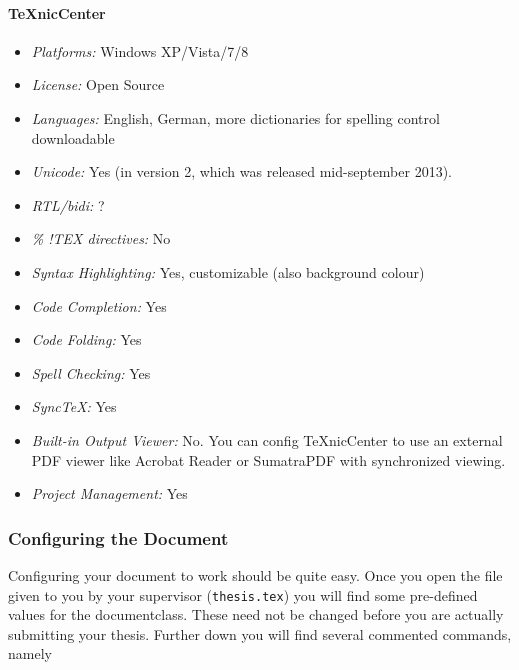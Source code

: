 \paragraph{TeXnicCenter}

\begin{itemize}
    \item \textit{Platforms:} Windows XP/Vista/7/8
    \item \textit{License:} Open Source
    \item \textit{Languages:} English, German, more dictionaries for spelling control downloadable
    \item \textit{Unicode:} Yes (in version 2, which was released mid-september 2013).
    \item \textit{RTL/bidi:} ?
    \item \textit{\% !TEX directives:} No
    \item \textit{Syntax Highlighting:} Yes, customizable (also background colour)
    \item \textit{Code Completion:} Yes
    \item \textit{Code Folding:} Yes
    \item \textit{Spell Checking:} Yes
    \item \textit{SyncTeX:} Yes
    \item \textit{Built-in Output Viewer:} No. You can config TeXnicCenter to use an external PDF viewer like Acrobat Reader or SumatraPDF with synchronized viewing.
    \item \textit{Project Management:} Yes
\end{itemize}

\subsubsection{Configuring the Document}\label{sec:user-documentation:configure-document}

Configuring your document to work should be quite easy.
Once you open the file given to you by your supervisor (\texttt{thesis.tex}) you will find some pre-defined values for the documentclass.
These need not be changed before you are actually submitting your thesis.
Further down you will find several commented commands, namely

